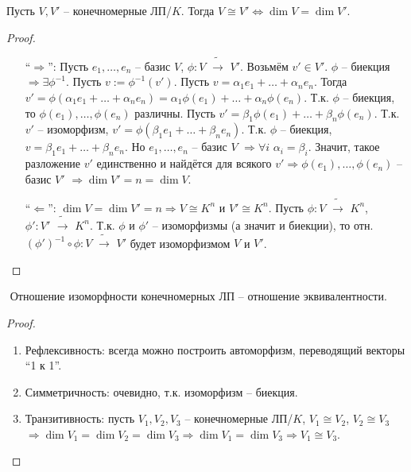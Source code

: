 \begin{theorem-nonna}
\end{theorem-nonna}
Пусть $V, V'$ -- конечномерные ЛП/$K$. Тогда $V \cong V'
\Leftrightarrow \dim V = \dim V'$.
\begin{proof} $ $

    \begin{itemize}
        \item[``$\Longrightarrow$'':] 
        Пусть $e_1, \dots, e_n$ -- базис $V$,
        $\phi : V \,\, \widetilde{\to} \,\, V'$.
        Возьмём $v' \in V'$. $\phi$ -- биекция $\Rightarrow
        \exists \phi^{-1}$. Пусть $v := \phi^{-1}(v')$.
        Пусть $v = \alpha_1 e_1 + \dots + \alpha_n e_n$.
        Тогда $v' = \phi(\alpha_1 e_1 + \dots + \alpha_n e_n) =
        \alpha_1 \phi(e_1) + \dots + \alpha_n \phi(e_n)$.
        Т.к. $\phi$ -- биекция, то $\phi(e_1), \dots, \phi(e_n)$
        различны. 
        Пусть $v' = \beta_1 \phi(e_1) + \dots + \beta_n \phi(e_n)$.
        Т.к. $v'$ -- изоморфизм, $v' = \phi(\beta_1 e_1 + 
        \dots + \beta_n e_n)$. Т.к. $\phi$ -- биекция,
        $v = \beta_1 e_1 + \dots + \beta_n e_n$.
        Но $e_1, \dots, e_n$ -- базис $V$
        $\Rightarrow \forall i \,\, \alpha_i = \beta_i$. Значит,
        такое разложение $v'$ единственно и найдётся для всякого
        $v' \Rightarrow \phi(e_1), \dots, \phi(e_n)$ -- базис $V'$
        $\Rightarrow \dim V' = n = \dim V$.

        \item[``$\Longleftarrow$'':]
        $\dim V = \dim V' = n \Rightarrow V \cong K^n$ и $V' \cong K^n$.
        Пусть $\phi : V \,\, \widetilde{\to} \,\, K^n$,
        $\phi' : V' \,\, \widetilde{\to} \,\, K^n$.
        Т.к. $\phi$ и $\phi'$ -- изоморфизмы (а значит и биекции),
        то отн. $(\phi')^{-1} \circ \phi : V \,\, \widetilde{\to} \,\, V'$
        будет изоморфизмом $V$ и $V'$.
    \end{itemize}
\end{proof}

\follow $ $ Отношение изоморфности конечномерных ЛП -- 
отношение эквивалентности.
\begin{proof} $ $

    \begin{enumerate}
        \item Рефлексивность: всегда можно построить автоморфизм,
        переводящий векторы ``1 к 1''.
        \item Симметричность: очевидно, т.к. изоморфизм -- биекция.
        \item Транзитивность: пусть $V_1, V_2, V_3$ -- конечномерные ЛП/$K$,
        $V_1 \cong V_2$, $V_2 \cong V_3$ $\Rightarrow \dim V_1 = \dim V_2
        = \dim V_3 \Rightarrow \dim V_1 = \dim V_3 \Rightarrow V_1 \cong V_3$.
        
    \end{enumerate}
\end{proof}